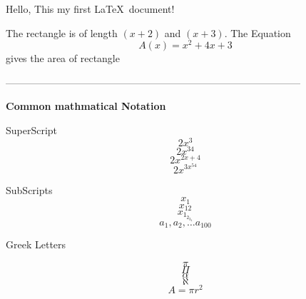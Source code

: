 \documentclass[]{article}
\begin{document}
Hello, This my first \LaTeX\ document!

The rectangle is of length $(x+2)$ and $(x+3)$.
The Equation $${A(x)=x^2+4x+3}$$ gives the area of rectangle

-----------------------------------------------------------------------------------------

\textbf{Common mathmatical Notation}

SuperScript $$2x^3$$
$$2x^{34}$$
$$2x^{2x+4}$$
$$2x^{3x^{54}}$$

SubScripts  $${x_1}$$
$${x_{12}}$$
$${x_{1_{2_{3_4}}}}$$
$${a_1}, {a_2}, \ldots {a_{100}}$$

Greek Letters   

$$\pi$$
$$\Pi$$
$$\alpha$$
$$\aleph$$
$$A= \pi r^2$$
\end{document}
